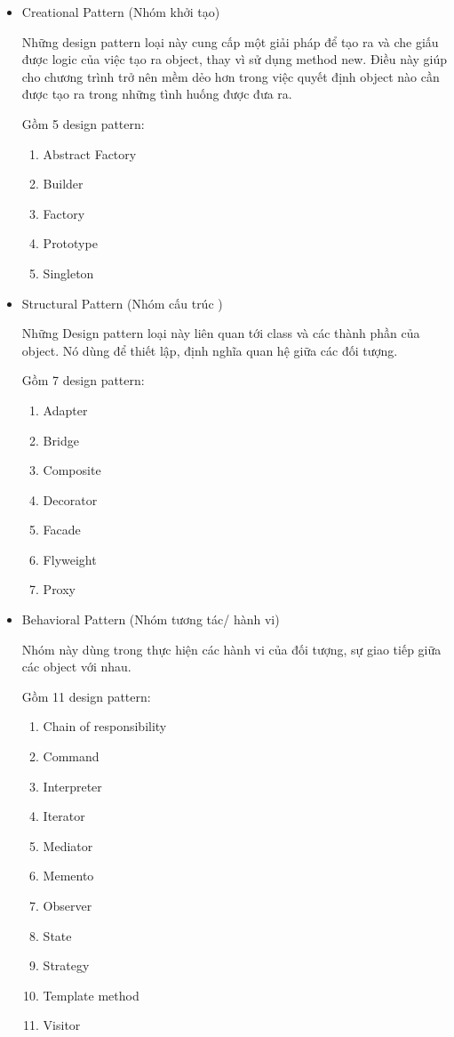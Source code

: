 \documentclass[14pt]{article}
\begin{document}
\begin{itemize}
    \item  Creational Pattern (Nhóm khởi tạo)
    
Những design pattern loại này cung cấp một giải pháp để tạo ra và che giấu được logic của việc tạo ra object, thay vì sử dụng method new. Điều này giúp cho chương trình trở nên mềm dẻo hơn trong việc quyết định object nào cần được tạo ra trong những tình huống được đưa ra.

Gồm 5 design pattern:

    \begin{enumerate}
        \item  Abstract Factory
        \item  Builder
        \item Factory
        \item  Prototype
        \item Singleton

    \end{enumerate}
    \item  Structural Pattern (Nhóm cấu trúc )
    
Những Design pattern loại này liên quan tới class và các thành phần của object. Nó dùng để thiết lập, định nghĩa quan hệ giữa các đối tượng.

Gồm 7 design pattern:

    \begin{enumerate}
        \item  Adapter
        \item  Bridge
        \item Composite
        \item  Decorator
        \item Facade
         \item Flyweight
          \item Proxy

    \end{enumerate}
     \item  Behavioral Pattern (Nhóm tương tác/ hành vi)
    
Nhóm này dùng trong thực hiện các hành vi của đối tượng, sự giao tiếp giữa các object với nhau.

Gồm 11 design pattern:

    \begin{enumerate}
        \item Chain of responsibility
        \item  Command
        \item Interpreter
        \item  Iterator
        \item Mediator
        \item  Memento
        \item  Observer
        \item State
        \item  Strategy
        \item  Template method
        \item Visitor
    \end{enumerate}
    
\end{itemize}
\end{document}
